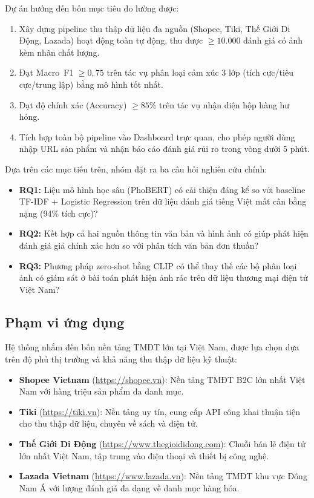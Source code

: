 Dự án hướng đến bốn mục tiêu đo lường được:

\begin{enumerate}[labelsep=10pt, leftmargin=2cm]
    \item Xây dựng pipeline thu thập dữ liệu đa nguồn (Shopee, Tiki, Thế Giới Di Động, Lazada) hoạt động toàn tự động, thu được $\geq 10.000$ đánh giá có ảnh kèm nhãn chất lượng.
    \item Đạt Macro~F1 $\geq 0{,}75$ trên tác vụ phân loại cảm xúc 3 lớp (tích cực/tiêu cực/trung lập) bằng mô hình tốt nhất.
    \item Đạt độ chính xác (Accuracy) $\geq 85\%$ trên tác vụ nhận diện hộp hàng hư hỏng.
    \item Tích hợp toàn bộ pipeline vào Dashboard trực quan, cho phép người dùng nhập URL sản phẩm và nhận báo cáo đánh giá rủi ro trong vòng dưới 5 phút.
\end{enumerate}

Dựa trên các mục tiêu trên, nhóm đặt ra ba câu hỏi nghiên cứu chính:

\begin{itemize}[labelsep=10pt, leftmargin=2cm]
    \item \textbf{RQ1:} Liệu mô hình học sâu (PhoBERT) có cải thiện đáng kể so với baseline TF-IDF + Logistic Regression trên dữ liệu đánh giá tiếng Việt mất cân bằng nặng (94\% tích cực)?
    \item \textbf{RQ2:} Kết hợp cả hai nguồn thông tin văn bản và hình ảnh có giúp phát hiện đánh giá giả chính xác hơn so với phân tích văn bản đơn thuần?
    \item \textbf{RQ3:} Phương pháp zero-shot bằng CLIP có thể thay thế các bộ phân loại ảnh có giám sát ở bài toán phát hiện ảnh rác trên dữ liệu thương mại điện tử Việt Nam?
\end{itemize}

\subsection{Phạm vi ứng dụng}

Hệ thống nhắm đến bốn nền tảng TMĐT lớn tại Việt Nam, được lựa chọn dựa trên độ phủ thị trường và khả năng thu thập dữ liệu kỹ thuật:

\begin{itemize}[labelsep=10pt, leftmargin=2cm]
    \item \textbf{Shopee Vietnam} (\url{https://shopee.vn}): Nền tảng TMĐT B2C lớn nhất Việt Nam với hàng triệu sản phẩm đa danh mục.
    \item \textbf{Tiki} (\url{https://tiki.vn}): Nền tảng uy tín, cung cấp API công khai thuận tiện cho thu thập dữ liệu, chuyên về sách và điện tử.
    \item \textbf{Thế Giới Di Động} (\url{https://www.thegioididong.com}): Chuỗi bán lẻ điện tử lớn nhất Việt Nam, tập trung vào điện thoại và thiết bị công nghệ.
    \item \textbf{Lazada Vietnam} (\url{https://www.lazada.vn}): Nền tảng TMĐT khu vực Đông Nam Á với lượng đánh giá đa dạng về danh mục hàng hóa.
\end{itemize}

